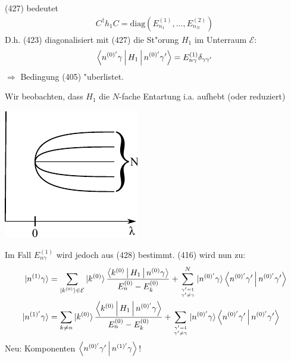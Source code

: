 \documentclass[a4paper]{scrartcl}
\newcommand{\eqn}[1]{\begin{align} #1 \end{align}}
\newcommand{\spl}[1]{\begin{split} #1 \end{split}}
\begin{document}
(427) bedeutet
\eqn{C^\dagger h_1 C = \mathrm{diag} \left( E_{n_1}^{(1)}, \ldots, E_{n_N}^{(2)} \right)}
D.h. (423) diagonalisiert mit (427) die St"orung $H_1$ im Unterraum $\mathcal E$:
\eqn{ \Braket{ n^{(0)'} \gamma | H_1 | n^{(0)'} \gamma'} = E_{n\gamma}^{(1)} \delta_{\gamma \gamma'}}
$\Longrightarrow$ Bedingung (405) "uberlistet.

Wir beobachten, dass $H_1$ die $N$-fache Entartung i.a. aufhebt (oder reduziert)
\begin{center}
\includegraphics{431EntartRed}
\end{center}
Im Fall $E_{n \gamma}^{(1)}$ wird jedoch aus (428) bestimmt. (416) wird nun zu:
\eqn{ 
\spl{
\ket{ n^{(1)} \gamma } & = \sum_{\ket{ k^{(0)}}  \in \mathcal E} \ket{ k^{(0)}} \frac{ \Braket{ k^{(0)} | H_1 | n^{(0)} \gamma }}{E_n^{(0)} - E_k^{(0)}} + \sum_{\gamma' =1 \atop \gamma' \neq \gamma}^N \ket{ n^{(0)'} \gamma} \Braket{ n^{(0)'} \gamma' | n^{(0)'} \gamma' } \\
\ket{n^{(1)'} \gamma} & = \sum_{k \neq n} \ket{k^{(0)}} \frac{ \Braket{ k^{(0)} | H_1 | n^{(0)'} \gamma} }{E_n^{(0)} - E_k^{(0)}} + \sum_{\gamma'=1 \atop \gamma' \neq \gamma} \ket{n^{(0)'} \gamma} \Braket{ n^{(0)'} \gamma' | n^{(0)'} \gamma'}
}}
Neu: Komponenten $\Braket{ n^{(0)'} \gamma' | n^{(1)'} \gamma}$!
\end{document}
